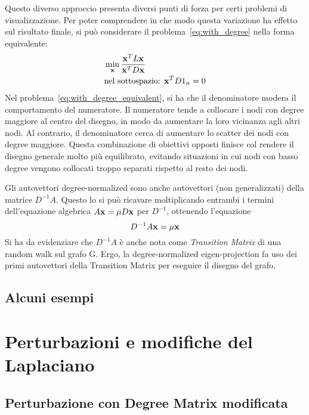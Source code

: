 \documentclass[10pt,a4paper]{article}
\begin{document}
Questo diverso approccio presenta diversi punti di forza per certi problemi di visualizzazione.
Per poter comprendere in che modo questa variazione ha effetto sul risultato finale, si può considerare il problema~\eqref{eq:with_degree} nella forma equivalente:
\begin{align}
    & \min_{\vb{x}} \frac{\vb{x}^T L \vb{x}}{\vb{x}^T D \vb{x}} \label{eq:with_degree_equivalent}\\
    & \text{nel sottospazio: } \vb{x}^T D 1_n = 0
\end{align}
Nel problema~\eqref{eq:with_degree_equivalent}, si ha che il denominatore modera il comportamento del numeratore.
Il numeratore tende a collocare i nodi con degree maggiore al centro del disegno, in modo da aumentare la loro vicinanza agli altri nodi.
Al contrario, il denominatore cerca di aumentare lo scatter dei nodi con degree maggiore.
Questa combinazione di obiettivi opposti finisce col rendere il disegno generale molto più equilibrato, evitando situazioni in cui nodi con basso degree vengono collocati troppo separati rispetto al resto dei nodi.

Gli autovettori degree-normalized sono anche autovettori (non generalizzati) della matrice \(D^{-1} A\).
Questo lo si può ricavare moltiplicando entrambi i termini dell'equazione algebrica \(A\vb{x} = \mu D \vb{x}\) per \(D^{-1}\), ottenendo l'equazione
\begin{equation}
    D^{-1} A \vb{x} = \mu\vb{x}
\end{equation}
Si ha da evidenziare che \(D^{-1} A\) è anche nota come \textit{Transition Matrix} di una random walk sul grafo G. Ergo, la degree-normalized eigen-projection fa uso dei primi autovettori della Transition Matrix per eseguire il disegno del grafo.


\subsection{Alcuni esempi}\label{subsec:drawing_examples}

\section{Perturbazioni e modifiche del Laplaciano}\label{sec:perturbazioni}

\subsection{Perturbazione con Degree Matrix modificata}
\end{document}
